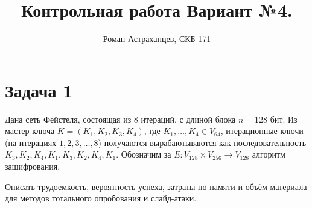 \documentclass[a4paper,12pt]{article}
\title{Контрольная работа \linebreak Вариант №4.}
\author{Роман Астраханцев, СКБ-171}
\begin{document}
	\maketitle
	
	\section*{Задача 1}
	Дана сеть Фейстеля, состоящая из 8 итераций, с длиной блока $n=128$ бит.
	Из мастер ключа $K=(K_1, K_2, K_3, K_4)$, где $K_1, \dots, K_4 \in V_{64}$, итерационные ключи (на итерациях $1, 2, 3, \dots, 8$) получаются вырабаютываются как последовательность $K_3, K_2, K_4, K_1, K_3, K_2, K_4, K_1$. Обозначим за $E: V_{128} \times V_{256} \rightarrow V_{128}$ алгоритм зашифрования.
	
	Описать трудоемкость, вероятность успеха, затраты по памяти и объём материала для методов тотального опробования и слайд-атаки.
		
\end{document}

